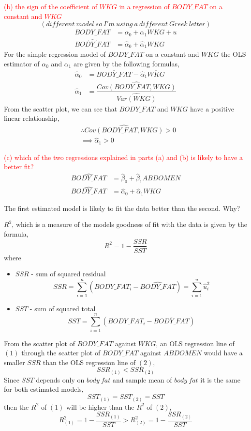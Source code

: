 \documentclass[12pt]{report}
\begin{document}
\noindent \textcolor{red}{(b) the sign of the coefficient of $WKG$ in a regression of $BODY\_FAT$ on a constant and $WKG$}$$(different\ model\ so\ I'm\ using\ a\ different\ Greek\ letter)$$
\begin{align*}
BODY\_FAT &= \alpha_0 + \alpha_1 WKG + u \\
\widehat{BODY\_FAT} &= \hat{\alpha}_0 + \hat{\alpha}_1 WKG
\end{align*}
\noindent For the simple regression model of $BODY\_FAT$ on a constant and $WKG$ the OLS estimator of $\alpha_0$ and $\alpha_1$ are given by the following formulas,
\begin{align*}
\hat{\alpha}_0 &= \overline{BODY\_FAT} - \hat{\alpha}_1\overline{WKG} \\
\hat{\alpha}_1 &= \dfrac{\widehat{Cov(BODY\_FAT,WKG)}}{\widehat{Var(WKG)}}
\end{align*}
\noindent From the scatter plot, we can see that $BODY\_FAT$ and $WKG$ have a positive linear relationship, 
\begin{align*}
&\therefore \widehat{Cov(BODY\_FAT,WKG)}>0 \\
&\implies \hat{\alpha}_1 > 0
\end{align*}

\noindent \textcolor{red}{(c) which of the two regressions explained in parts (a) and (b) is likely to have a better fit?} 
\begin{align}
\widehat{BODY\_FAT} &= \hat{\beta}_0 + \hat{\beta}_1 ABDOMEN \\
\widehat{BODY\_FAT} &= \hat{\alpha}_0 + \hat{\alpha}_1 WKG
\end{align}

\noindent The first estimated model is likely to fit the data better than the second. Why?

\noindent $R^2$, which is a measure of the models goodness of fit with the data is given by the formula, $$R^2 = 1 - \dfrac{SSR}{SST}$$ where \begin{itemize}
	\item $SSR$ - sum of squared residual $$SSR = \sum_{i=1}^{n}(BODY\_FAT_i - \widehat{BODY\_FAT}) = \sum_{i=1}^{n}\hat{u}^2_i$$
	\item $SST$ - sum of squared total $$SST = \sum_{i=1}^{n}(BODY\_FAT_i - \overline{BODY\_FAT})$$
\end{itemize}

\noindent From the scatter plot of $BODY\_FAT$ against $WKG$, an OLS regression line of $(1)$ through the scatter plot of $BODY\_FAT$ against $ABDOMEN$ would have a smaller $SSR$ than the OLS regression line of  $(2)$, $$SSR_{(1)} < SSR_{(2)}$$
\noindent Since $SST$ depends only on $body\ fat$ and sample mean of $body\ fat$ it is the same for both estimated models, $$SST_{(1)} = SST_{(2)} = SST$$ then the $R^2$ of $(1)$ will be higher than the $R^2$ of $(2)$, $$R^2_{(1)} = 1 - \dfrac{SSR_{(1)}}{SST} > R^2_{(2)} = 1 - \dfrac{SSR_{(2)}}{SST}$$
\end{document}
